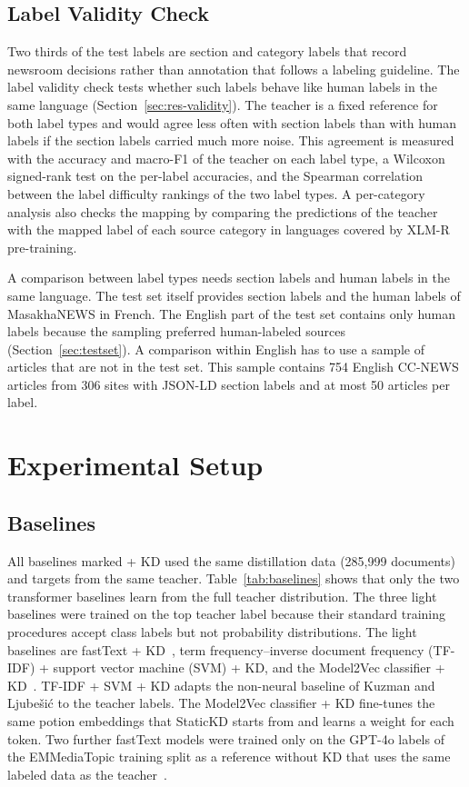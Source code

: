 \documentclass{ieeeaccess}
\begin{document}
\subsection{Label Validity Check}
\label{sec:validity-design}
Two thirds of the test labels are section and category labels that record newsroom decisions rather than annotation that follows a labeling guideline. The label validity check tests whether such labels behave like human labels in the same language (Section~\ref{sec:res-validity}). The teacher is a fixed reference for both label types and would agree less often with section labels than with human labels if the section labels carried much more noise. This agreement is measured with the accuracy and macro-F1 of the teacher on each label type, a Wilcoxon signed-rank test on the per-label accuracies, and the Spearman correlation between the label difficulty rankings of the two label types. A per-category analysis also checks the mapping by comparing the predictions of the teacher with the mapped label of each source category in languages covered by XLM-R pre-training.

A comparison between label types needs section labels and human labels in the same language. The test set itself provides section labels and the human labels of MasakhaNEWS in French. The English part of the test set contains only human labels because the sampling preferred human-labeled sources (Section~\ref{sec:testset}). A comparison within English has to use a sample of articles that are not in the test set. This sample contains 754 English CC-NEWS articles from 306 sites with JSON-LD section labels and at most 50 articles per label.

\section{Experimental Setup}
\label{sec:setup}
\subsection{Baselines}
\label{sec:baselines}
All baselines marked + KD used the same distillation data (285,999 documents) and targets from the same teacher. Table~\ref{tab:baselines} shows that only the two transformer baselines learn from the full teacher distribution. The three light baselines were trained on the top teacher label because their standard training procedures accept class labels but not probability distributions. The light baselines are fastText + KD~\cite{joulin2017bag}, term frequency--inverse document frequency (TF-IDF) + support vector machine (SVM) + KD, and the Model2Vec classifier + KD~\cite{tulkens2024model2vec}. TF-IDF + SVM + KD adapts the non-neural baseline of Kuzman and Ljube\v{s}i\'c to the teacher labels. The Model2Vec classifier + KD fine-tunes the same potion embeddings that StaticKD starts from and learns a weight for each token. Two further fastText models were trained only on the GPT-4o labels of the EMMediaTopic training split as a reference without KD that uses the same labeled data as the teacher~\cite{kuzman2025llm}.
\end{document}
